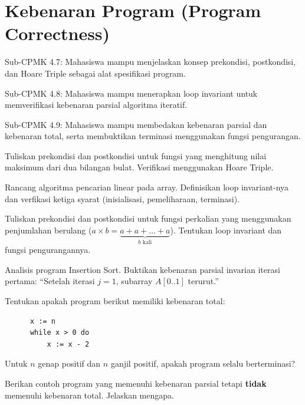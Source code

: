 \documentclass[../main]{subfiles}
\begin{document}
\chapter{Kebenaran Program (Program Correctness)}

\begin{subcpmk}
  \item Sub-CPMK 4.7: Mahasiswa mampu menjelaskan konsep prekondisi, postkondisi, dan Hoare Triple sebagai alat spesifikasi program.
  \item Sub-CPMK 4.8: Mahasiswa mampu menerapkan loop invariant untuk memverifikasi kebenaran parsial algoritma iteratif.
  \item Sub-CPMK 4.9: Mahasiswa mampu membedakan kebenaran parsial dan kebenaran total, serta membuktikan terminasi menggunakan fungsi pengurangan.
\end{subcpmk}










\begin{aktivitas}
  \item Tuliskan prekondisi dan postkondisi untuk fungsi yang menghitung nilai maksimum dari dua bilangan bulat. Verifikasi menggunakan Hoare Triple.
  \item Rancang algoritma pencarian linear pada array. Definisikan loop invariant-nya dan verfikasi ketiga syarat (inisialisasi, pemeliharaan, terminasi).
  \item Tuliskan prekondisi dan postkondisi untuk fungsi perkalian yang menggunakan penjumlahan berulang ($a \times b = \underbrace{a + a + \ldots + a}_{b \text{ kali}}$). Tentukan loop invariant dan fungsi pengurangannya.
  \item Analisis program Insertion Sort. Buktikan kebenaran parsial invarian iterasi pertama: ``Setelah iterasi $j = 1$, subarray $A[0..1]$ terurut.''
  \item Tentukan apakah program berikut memiliki kebenaran total:
  \begin{verbatim}
      x := n
      while x > 0 do
          x := x - 2
  \end{verbatim}
  Untuk $n$ genap positif dan $n$ ganjil positif, apakah program selalu berterminasi?
  \item Berikan contoh program yang memenuhi kebenaran parsial tetapi \textbf{tidak} memenuhi kebenaran total. Jelaskan mengapa.
\end{aktivitas}
\end{document}
